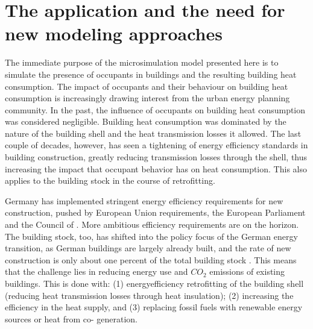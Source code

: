 \documentclass[11pt]{IJM-article}
\begin{document}

\section{The application and the need for new modeling approaches}\label{sec:1}

The immediate purpose of the microsimulation model presented here is to
simulate the presence of occupants in buildings and the resulting building heat
consumption. The impact of occupants and their behaviour on building heat
consumption is increasingly drawing interest from the urban energy planning
community. In the past, the influence of occupants on building heat consumption
was considered negligible. Building heat consumption was dominated by the
nature of the building shell and the heat transmission losses it allowed. The
last couple of decades, however, has seen a tightening of energy efficiency
standards in building construction, greatly reducing transmission losses
through the shell, thus increasing the impact that occupant behavior has on
heat consumption. This also applies to the building stock in the course of
retrofitting.

Germany has implemented stringent energy efficiency requirements for new
construction, pushed by European Union requirements, the European Parliament
and the Council of .  More ambitious efficiency
requirements are on the horizon.  The building stock, too, has shifted into the
policy focus of the German energy transition, as German buildings are largely
already built, and the rate of new construction is only about one percent of
the total building stock .  This means that the challenge
lies in reducing energy use and $CO_{2}$ emissions of existing buildings.  This
is done with: (1) energyefficiency retrofitting of the building shell (reducing
heat transmission losses through heat insulation); (2) increasing the
efficiency in the heat supply, and (3) replacing fossil fuels with renewable
energy sources or heat from co- generation.
\end{document}
